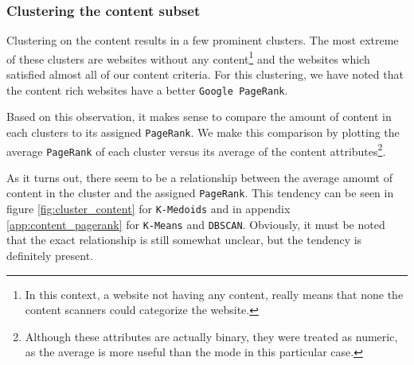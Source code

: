\subsubsection{Clustering the content subset}

Clustering on the content results in a few prominent clusters. The most extreme of these clusters are websites without any content\footnote{In this context, a website not having any content, really means that none the content scanners could categorize the website.} and the websites which satisfied almost all of our content criteria. For this clustering, we have noted that the content rich websites have a better \texttt{Google PageRank}.

Based on this observation, it makes sense to compare the amount of content in each clusters to its assigned \texttt{PageRank}. We make this comparison by plotting the average \texttt{PageRank} of each cluster versus its average of the content attributes\footnote{Although these attributes are actually binary, they were treated as numeric, as the average is more useful than the mode in this particular case.}.

As it turns out, there seem to be a relationship between the average amount of content in the cluster and the assigned \texttt{PageRank}. This tendency can be seen in figure \ref{fig:cluster_content} for \texttt{K-Medoids} and in appendix \ref{app:content_pagerank} for \texttt{K-Means} and \texttt{DBSCAN}. Obviously, it must be noted that the exact relationship is still somewhat unclear, but the tendency is definitely present.



